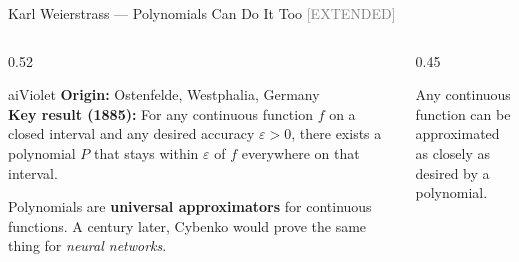 \begin{frame}{Karl Weierstrass --- Polynomials Can Do It Too \hfill\small\textcolor{gray}{[EXTENDED]}}

  \begin{columns}[T]
    \begin{column}{0.52\textwidth}
      \begin{personbox}{aiViolet}
        \textbf{Origin:} Ostenfelde, Westphalia, Germany\\[3pt]
        \textbf{Key result (1885):} For any continuous function $f$ on
        a closed interval and any desired accuracy $\varepsilon > 0$,
        there exists a polynomial $P$ that stays within $\varepsilon$
        of $f$ everywhere on that interval.
      \end{personbox}

      \vspace{0.4em}
      \begin{insightbox}
        Polynomials are \textbf{universal approximators} for continuous
        functions. A century later, Cybenko would prove the same thing
        for \emph{neural networks}.
      \end{insightbox}
    \end{column}

    \begin{column}{0.45\textwidth}
      \par\vspace{2pt}
      {\scriptsize\centering Any continuous function can be approximated\\
       as closely as desired by a polynomial.\par}
    \end{column}
  \end{columns}


\end{frame}
